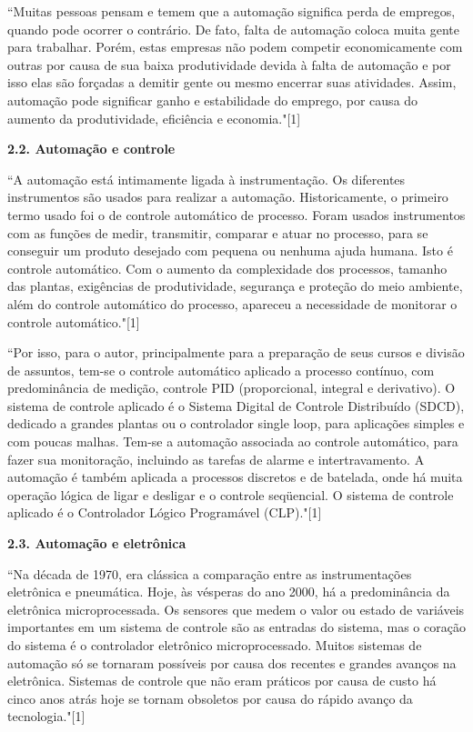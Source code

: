 \documentclass[a4paper, 12pt]{article}
\begin{document}
``Muitas pessoas pensam e temem que a automação significa perda de empregos,
quando pode ocorrer o contrário. De fato, falta de automação coloca muita gente
para trabalhar. Porém, estas empresas não podem competir economicamente com
outras por causa de sua baixa produtividade devida à falta de automação
e por isso elas são forçadas a demitir gente ou mesmo encerrar suas atividades.
Assim, automação pode significar ganho e estabilidade do emprego, por causa do
aumento da produtividade, eficiência e economia."[1]

\textbf{2.2. Automação e controle}

``A automação está intimamente ligada à instrumentação. Os diferentes
instrumentos são usados para realizar a automação.
Historicamente, o primeiro termo usado foi o de controle automático de processo.
Foram usados instrumentos com as funções de medir, transmitir, comparar e
atuar no processo, para se conseguir um produto desejado com pequena ou
nenhuma ajuda humana. Isto é controle automático.
Com o aumento da complexidade dos processos, tamanho das plantas, exigências de
produtividade, segurança e proteção do meio ambiente, além do controle automático
do processo, apareceu a necessidade de monitorar o controle automático."[1]

``Por isso, para o autor, principalmente para a preparação de seus cursos e
divisão de assuntos, tem-se o controle automático aplicado a processo contínuo,
com predominância de medição, controle PID (proporcional, integral e derivativo).
O sistema de controle aplicado é o Sistema Digital de Controle Distribuído (SDCD),
dedicado a grandes plantas ou o controlador single loop, para aplicações
simples e com poucas malhas. Tem-se a automação associada ao controle automático,
para fazer sua monitoração, incluindo as tarefas de alarme e intertravamento.
A automação é também aplicada a processos discretos e de batelada, onde há muita
operação lógica de ligar e desligar e o controle seqüencial.
O sistema de controle aplicado é o Controlador Lógico Programável (CLP)."[1]

\textbf{2.3. Automação e eletrônica}

``Na década de 1970, era clássica a comparação entre as instrumentações
eletrônica e pneumática. Hoje, às vésperas do ano 2000, há a predominância da
eletrônica microprocessada.
Os sensores que medem o valor ou estado de variáveis importantes em um
sistema de controle são as entradas do sistema, mas o coração do sistema é o
controlador eletrônico microprocessado. Muitos sistemas de automação só se
tornaram possíveis por causa dos recentes e grandes avanços na eletrônica. 
Sistemas de controle que não eram práticos por causa de custo há cinco anos 
atrás hoje se tornam obsoletos por causa do rápido avanço da tecnologia."[1]
\end{document}
